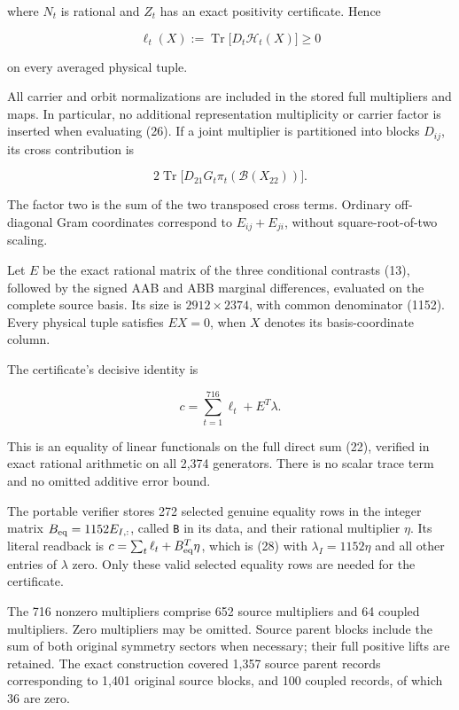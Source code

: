 \documentclass[
  11pt,
]{article}
\begin{document}
where \(N_t\) is rational and \(Z_t\) has an exact positivity
certificate. Hence

\[
\ell_t(X):=\operatorname{Tr}\bigl[D_t\mathcal H_t(X)\bigr]\geq0
\tag{26}
\]

on every averaged physical tuple.

All carrier and orbit normalizations are included in the stored full
multipliers and maps. In particular, no additional representation
multiplicity or carrier factor is inserted when evaluating (26). If a
joint multiplier is partitioned into blocks \(D_{ij}\), its cross
contribution is

\[
2\operatorname{Tr}\bigl[D_{21}G_t\pi_t(\mathcal B(X_{22}))\bigr].
\tag{27}
\]

The factor two is the sum of the two transposed cross terms. Ordinary
off-diagonal Gram coordinates correspond to \(E_{ij}+E_{ji}\), without
square-root-of-two scaling.

Let \(E\) be the exact rational matrix of the three conditional
contrasts (13), followed by the signed AAB and ABB marginal differences,
evaluated on the complete source basis. Its size is \(2912\times2374\),
with common denominator (1152). Every physical tuple satisfies \(EX=0\),
when \(X\) denotes its basis-coordinate column.

The certificate's decisive identity is

\[
\boxed{\qquad c=\sum_{t=1}^{716}\ell_t+E^T\lambda.\qquad}
\tag{28}
\]

This is an equality of linear functionals on the full direct sum (22),
verified in exact rational arithmetic on all 2,374 generators. There is
no scalar trace term and no omitted additive error bound.

The portable verifier stores 272 selected genuine equality rows in the
integer matrix \(B_{\rm eq}=1152E_{I,:}\), called \texttt{B} in its
data, and their rational multiplier \(\eta\). Its literal readback is
\(c=\sum_t\ell_t+B_{\rm eq}^T\eta\), which is (28) with
\(\lambda_I=1152\eta\) and all other entries of \(\lambda\) zero. Only
these valid selected equality rows are needed for the certificate.

The 716 nonzero multipliers comprise 652 source multipliers and 64
coupled multipliers. Zero multipliers may be omitted. Source parent
blocks include the sum of both original symmetry sectors when necessary;
their full positive lifts are retained. The exact construction covered
1,357 source parent records corresponding to 1,401 original source
blocks, and 100 coupled records, of which 36 are zero.
\end{document}
